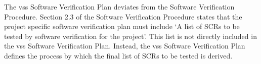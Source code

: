 The \Gls{vss} Software Verification Plan deviates from the Software Verification
Procedure. Section 2.3 of the Software Verification Procedure states that the
project specific software verification plan must include `A list of SCRs to be
tested by software verification for the project'. This list is not directly
included in the \Gls{vss} Software Verification Plan. Instead, the \Gls{vss}
Software Verification Plan defines the process by which the final list of SCRs
to be tested is derived.

